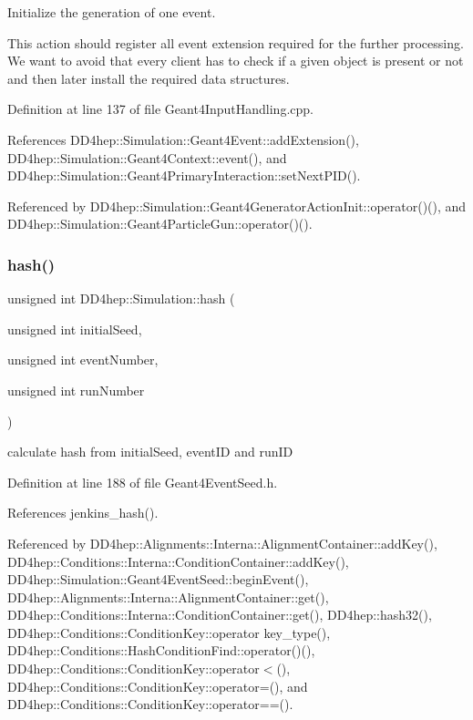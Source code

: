 Initialize the generation of one event. 

This action should register all event extension required for the further processing. We want to avoid that every client has to check if a given object is present or not and then later install the required data structures.

Definition at line 137 of file Geant4\+Input\+Handling.\+cpp.



References D\+D4hep\+::\+Simulation\+::\+Geant4\+Event\+::add\+Extension(), D\+D4hep\+::\+Simulation\+::\+Geant4\+Context\+::event(), and D\+D4hep\+::\+Simulation\+::\+Geant4\+Primary\+Interaction\+::set\+Next\+P\+I\+D().



Referenced by D\+D4hep\+::\+Simulation\+::\+Geant4\+Generator\+Action\+Init\+::operator()(), and D\+D4hep\+::\+Simulation\+::\+Geant4\+Particle\+Gun\+::operator()().

\hypertarget{namespace_d_d4hep_1_1_simulation_ae0f666f5766acb8613abdf7257606965}{}\label{namespace_d_d4hep_1_1_simulation_ae0f666f5766acb8613abdf7257606965} 
\subsubsection{\texorpdfstring{hash()}{hash()}}
{\footnotesize\ttfamily unsigned int D\+D4hep\+::\+Simulation\+::hash (\begin{DoxyParamCaption}\item[{unsigned int}]{initial\+Seed,  }\item[{unsigned int}]{event\+Number,  }\item[{unsigned int}]{run\+Number }\end{DoxyParamCaption})}



calculate hash from initial\+Seed, event\+ID and run\+ID 



Definition at line 188 of file Geant4\+Event\+Seed.\+h.



References jenkins\+\_\+hash().



Referenced by D\+D4hep\+::\+Alignments\+::\+Interna\+::\+Alignment\+Container\+::add\+Key(), D\+D4hep\+::\+Conditions\+::\+Interna\+::\+Condition\+Container\+::add\+Key(), D\+D4hep\+::\+Simulation\+::\+Geant4\+Event\+Seed\+::begin\+Event(), D\+D4hep\+::\+Alignments\+::\+Interna\+::\+Alignment\+Container\+::get(), D\+D4hep\+::\+Conditions\+::\+Interna\+::\+Condition\+Container\+::get(), D\+D4hep\+::hash32(), D\+D4hep\+::\+Conditions\+::\+Condition\+Key\+::operator key\+\_\+type(), D\+D4hep\+::\+Conditions\+::\+Hash\+Condition\+Find\+::operator()(), D\+D4hep\+::\+Conditions\+::\+Condition\+Key\+::operator$<$(), D\+D4hep\+::\+Conditions\+::\+Condition\+Key\+::operator=(), and D\+D4hep\+::\+Conditions\+::\+Condition\+Key\+::operator==().

